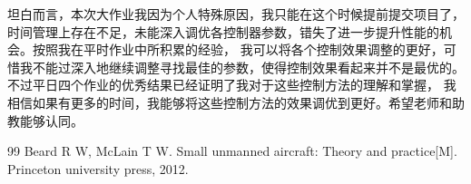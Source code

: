 \documentclass[UTF8, a4paper, 12pt]{ctexart}
\begin{document}
坦白而言，本次大作业我因为个人特殊原因，我只能在这个时候提前提交项目了，时间管理上存在不足，未能深入调优各控制器参数，错失了进一步提升性能的机会。按照我在平时作业中所积累的经验，
我可以将各个控制效果调整的更好，可惜我不能过深入地继续调整寻找最佳的参数，使得控制效果看起来并不是最优的。不过平日四个作业的优秀结果已经证明了我对于这些控制方法的理解和掌握，
我相信如果有更多的时间，我能够将这些控制方法的效果调优到更好。希望老师和助教能够认同。


\begin{thebibliography}{99}
     Beard R W, McLain T W. Small unmanned aircraft: Theory and practice[M]. Princeton university press, 2012.
\end{thebibliography}
\end{document}
